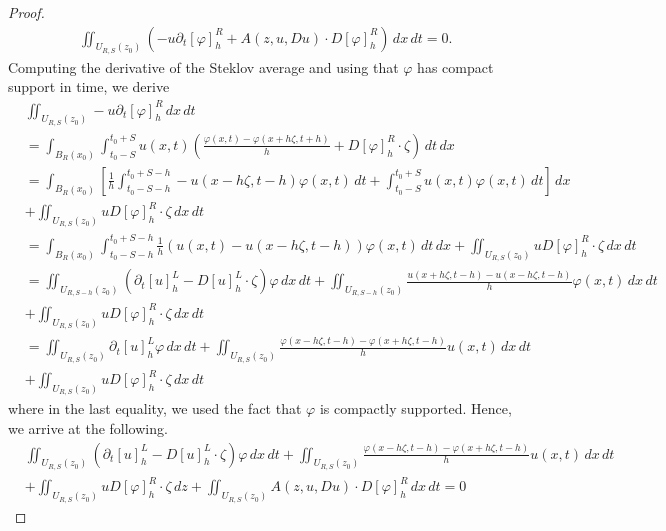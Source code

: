 \documentclass[notitlepage,11pt,reqno]{amsart}
\theoremstyle{definition}
\numberwithin{equation}{section}
\begin{document}
\begin{proof}
\begin{align*}
&\iint_{U_{R, S}(z_0)}\left(-u\partial_{t}[\varphi]^R_{h}+A(z, u, Du)\cdot D[\varphi]^R_{h}\right)\, dx\, dt=0.
\end{align*}
Computing the derivative of the Steklov average and using that $\varphi$
has compact support in time, we derive
\begin{align*}
&\iint_{U_{R, S}(z_0)}-u\partial_{t}[\varphi]^R_{h} \,dx\, dt \\
& =\int_{B_{R}(x_0)}\int_{t_0-S}^{t_0+S}u(x,t)\left(\frac{\varphi(x,t)-\varphi(x+h\zeta,t+h)}{h}+D[\varphi]_{h}^{R}\cdot\zeta\right)\,dt\,dx\\
 & =\int_{B_{R}(x_0)}\left[\frac{1}{h}\int_{t_0-S-h}^{t_0+S-h}-u(x-h\zeta,t-h)\varphi(x,t)\,dt+\int_{t_0-S}^{t_0+S}u(x,t)\varphi(x,t)\,dt\right]\, dx\\
 &+\iint_{U_{R, S}(z_0)}uD[\varphi]^R_h\cdot \zeta \, dx\, dt\\
 & =\int_{B_{R}(x_0)}\int_{t_0-S-h}^{t_0+S-h}\frac{1}{h}(u(x,t)-u(x-h \zeta,t-h))\varphi(x,t)\, dt\, dx
 +\iint_{U_{R, S}(z_0)}uD[\varphi]^R_h\cdot \zeta \, dx\, dt\\
 & =\iint_{U_{R, S-h}(z_0)}\left(\partial_{t}[u]^L_{h}-D[u]^L_h\cdot \zeta\right)\varphi\,dx\, dt+\iint_{U_{R, S-h}(z_0)}\frac{u(x+h\zeta, t-h)-u(x-h\zeta, t-h)}{h}\varphi(x, t)\,dx\, dt\\
 &+\iint_{U_{R, S}(z_0)}uD[\varphi]^R_h\cdot \zeta \, dx\, dt\\
 &=\iint_{U_{R, S}(z_0)}\partial_{t}[u]^L_{h}\varphi\,dx\, dt+\iint_{U_{R, S}(z_0)}\frac{\varphi(x-h\zeta, t-h)-\varphi(x+h\zeta, t-h)}{h}u(x, t)\,dx\, dt\\
 &+\iint_{U_{R, S}(z_0)}uD[\varphi]^R_h\cdot \zeta \, dx\, dt
\end{align*}
where in the last equality, we used the fact that $\varphi$ is compactly supported.
Hence, we arrive at the following.
\begin{align}\label{weak formulation_1}
&\iint_{U_{R, S}(z_0)}\left(\partial_{t}[u]^L_{h}-D[u]^L_h\cdot \zeta\right)\varphi\,dx\, dt+\iint_{U_{R, S}(z_0)}\frac{\varphi(x-h\zeta, t-h)-\varphi(x+h\zeta, t-h)}{h}u(x, t)\,dx\, dt\nonumber\\
 &+\iint_{U_{R, S}(z_0)}uD[\varphi]^R_h\cdot \zeta \, dz+\iint_{U_{R, S}(z_0)}A(z, u, Du)\cdot D[\varphi]^R_{h}\,dx\, dt=0
\end{align}


\end{proof}
\end{document}
